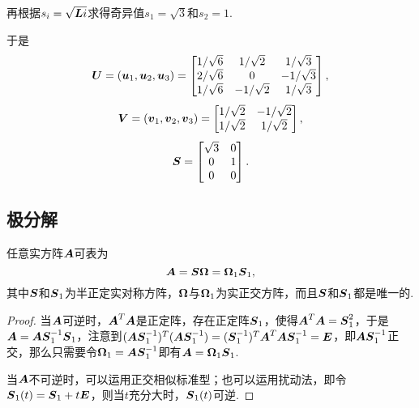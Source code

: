 \begin{example}
\begin{solution}
再根据\(s_i = \sqrt{\boldsymbol{L}{i}}\)求得奇异值\(s_1 = \sqrt{3}\)和\(s_2 = 1\).

于是\[
\boldsymbol{U} = (\boldsymbol{u}_1,\boldsymbol{u}_2,\boldsymbol{u}_3) = \begin{bmatrix}
1/\sqrt{6} & 1/\sqrt{2} & 1/\sqrt{3} \\
2/\sqrt{6} & 0 & -1/\sqrt{3} \\
1/\sqrt{6} & -1/\sqrt{2} & 1/\sqrt{3}
\end{bmatrix},
\]\[
\boldsymbol{V} = (\boldsymbol{v}_1,\boldsymbol{v}_2,\boldsymbol{v}_3) = \begin{bmatrix}
1/\sqrt{2} & -1/\sqrt{2} \\
1/\sqrt{2} & 1/\sqrt{2}
\end{bmatrix},
\]\[
\S = \begin{bmatrix}
\sqrt{3} & 0 \\
0 & 1 \\
0 & 0
\end{bmatrix}.
\]
\end{solution}
\end{example}

\subsection{极分解}
\begin{theorem}
\def\S{\mat{S}}
\def\M{\mat{\Omega}}
任意实方阵\(\boldsymbol{A}\)可表为\[
\A = \S\M = \M_1 \S_1,
\]其中\(\S\)和\(\S_1\)为半正定实对称方阵，\(\M\)与\(\M_1\)为实正交方阵，而且\(\S\)和\(\S_1\)都是唯一的.
\begin{proof}
当\(\boldsymbol{A}\)可逆时，\(\boldsymbol{A}^T \boldsymbol{A}\)是正定阵，存在正定阵\(\S_1\)，使得\(\A^T \A = \S_1^2\)，于是\(\A = \A \S_1^{-1} \S_1\)，注意到\((\A \S_1^{-1})^T (\A \S_1^{-1}) = (\S_1^{-1})^T \A^T \A \S_1^{-1} = \E\)，即\(\A \S_1^{-1}\)正交，那么只需要令\(\M_1 = \A \S_1^{-1}\)即有\(\A = \M_1 \S_1\).

当\(\boldsymbol{A}\)不可逆时，可以运用正交相似标准型；也可以运用扰动法，即令\(\S_1(t) = \S_1 + t\E\)，则当\(t\)充分大时，\(\S_1(t)\)可逆.
\end{proof}
\end{theorem}
